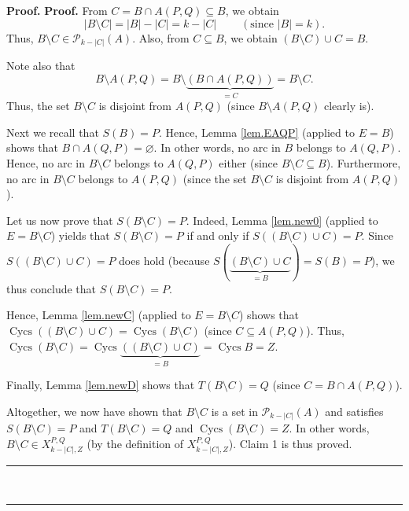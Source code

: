\documentclass[numbers=enddot,12pt,final,onecolumn,notitlepage]{scrartcl}%
\theoremstyle{definition}
\newenvironment{proof}[1][Proof]{\noindent\textbf{#1.} }{\ \rule{0.5em}{0.5em}}
\newenvironment{noncompile}{}{}
\theoremstyle{plainsl}
\begin{document}
\begin{proof}
\begin{proof}
From $C=B\cap A\left(  P,Q\right)  \subseteq B$, we obtain
\[
\left\vert B\setminus C\right\vert =\left\vert B\right\vert -\left\vert
C\right\vert =k-\left\vert C\right\vert \ \ \ \ \ \ \ \ \ \ \left(
\text{since }\left\vert B\right\vert =k\right)  .
\]
Thus, $B\setminus C\in\mathcal{P}_{k-\left\vert C\right\vert }\left(
A\right)  $. Also, from $C\subseteq B$, we obtain $\left(  B\setminus
C\right)  \cup C=B$.

\begin{noncompile}
Note also that%
\[
B\setminus A\left(  P,Q\right)  =B\setminus\underbrace{\left(  B\cap
A(P,Q)\right)  }_{=C}=B\setminus C.
\]
Thus, the set $B\setminus C$ is disjoint from $A\left(  P,Q\right)  $ (since
$B\setminus A\left(  P,Q\right)  $ clearly is).

Next we recall that $S\left(  B\right)  =P$. Hence, Lemma \ref{lem.EAQP}
(applied to $E=B$) shows that $B\cap A\left(  Q,P\right)  =\varnothing$. In
other words, no arc in $B$ belongs to $A\left(  Q,P\right)  $. Hence, no arc
in $B\setminus C$ belongs to $A\left(  Q,P\right)  $ either (since $B\setminus
C\subseteq B$). Furthermore, no arc in $B\setminus C$ belongs to $A\left(
P,Q\right)  $ (since the set $B\setminus C$ is disjoint from $A\left(
P,Q\right)  $).
\end{noncompile}

Let us now prove that $S\left(  B\setminus C\right)  =P$. Indeed, Lemma
\ref{lem.new0} (applied to $E=B\setminus C$) yields that $S\left(  B\setminus
C\right)  =P$ if and only if $S\left(  \left(  B\setminus C\right)  \cup
C\right)  =P$. Since $S\left(  \left(  B\setminus C\right)  \cup C\right)  =P$
does hold (because $S\left(  \underbrace{\left(  B\setminus C\right)  \cup
C}_{=B}\right)  =S\left(  B\right)  =P$), we thus conclude that $S\left(
B\setminus C\right)  =P$.

Hence, Lemma \ref{lem.newC} (applied to $E=B\setminus C$) shows that
$\operatorname*{Cycs}\left(  \left(  B\setminus C\right)  \cup C\right)
=\operatorname*{Cycs}\left(  B\setminus C\right)  $ (since $C\subseteq
A\left(  P,Q\right)  $). Thus, $\operatorname*{Cycs}\left(  B\setminus
C\right)  =\operatorname*{Cycs}\underbrace{\left(  \left(  B\setminus
C\right)  \cup C\right)  }_{=B}=\operatorname*{Cycs}B=Z$.

Finally, Lemma \ref{lem.newD} shows that $T\left(  B\setminus C\right)  =Q$
(since $C=B\cap A\left(  P,Q\right)  $).

Altogether, we now have shown that $B\setminus C$ is a set in $\mathcal{P}%
_{k-\left\vert C\right\vert }\left(  A\right)  $ and satisfies $S\left(
B\setminus C\right)  =P$ and $T\left(  B\setminus C\right)  =Q$ and
$\operatorname*{Cycs}\left(  B\setminus C\right)  =Z$. In other words,
$B\setminus C\in X_{k-\left\vert C\right\vert ,Z}^{P,Q}$ (by the definition of
$X_{k-\left\vert C\right\vert ,Z}^{P,Q}$). Claim 1 is thus proved.
\end{proof}


\end{proof}
\end{document}
